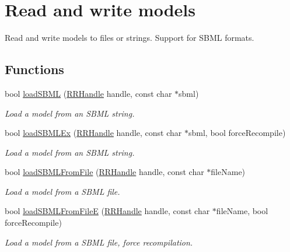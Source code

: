 \hypertarget{group__loadsave}{\section{Read and write models}
\label{group__loadsave}
}


Read and write models to files or strings. Support for S\-B\-M\-L formats.  


\subsection*{Functions}
\begin{DoxyCompactItemize}
\item 
bool \hyperlink{group__loadsave_gafb3515fd8472da389f5f24530017f037}{load\-S\-B\-M\-L} (\hyperlink{rrc__types_8h_a1d68f0592372208fa5a5f2799ea4b3ae}{R\-R\-Handle} handle, const char $\ast$sbml)
\begin{DoxyCompactList}\small\item\em Load a model from an S\-B\-M\-L string. \end{DoxyCompactList}\item 
bool \hyperlink{group__loadsave_ga80ede4ecc6e4e697e289d187c1a8d844}{load\-S\-B\-M\-L\-Ex} (\hyperlink{rrc__types_8h_a1d68f0592372208fa5a5f2799ea4b3ae}{R\-R\-Handle} handle, const char $\ast$sbml, bool force\-Recompile)
\begin{DoxyCompactList}\small\item\em Load a model from an S\-B\-M\-L string. \end{DoxyCompactList}\item 
bool \hyperlink{group__loadsave_ga275b8f8d7350505c383fdc9634713041}{load\-S\-B\-M\-L\-From\-File} (\hyperlink{rrc__types_8h_a1d68f0592372208fa5a5f2799ea4b3ae}{R\-R\-Handle} handle, const char $\ast$file\-Name)
\begin{DoxyCompactList}\small\item\em Load a model from a S\-B\-M\-L file. \end{DoxyCompactList}\item 
bool \hyperlink{group__loadsave_gaba8e934b2e2c045312686c5e857aacab}{load\-S\-B\-M\-L\-From\-File\-E} (\hyperlink{rrc__types_8h_a1d68f0592372208fa5a5f2799ea4b3ae}{R\-R\-Handle} handle, const char $\ast$file\-Name, bool force\-Recompile)
\begin{DoxyCompactList}\small\item\em Load a model from a S\-B\-M\-L file, force recompilation. \end{DoxyCompactList}\item 

\end{DoxyCompactItemize}
